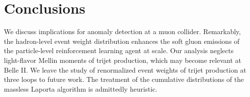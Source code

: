 \section{Conclusions}\label{sec:conclusions}

We discuss implications for anomaly detection at a muon collider.
Remarkably, the hadron-level event weight distribution enhances the soft
gluon emissions of the particle-level reinforcement learning agent at
scale. Our analysis neglects light-flavor Mellin moments of trijet
production, which may become relevant at Belle II. We leave the study of
renormalized event weights of trijet production at three loops to future
work. The treatment of the cumulative distributions of the massless
Laporta algorithm is admittedly heuristic.

